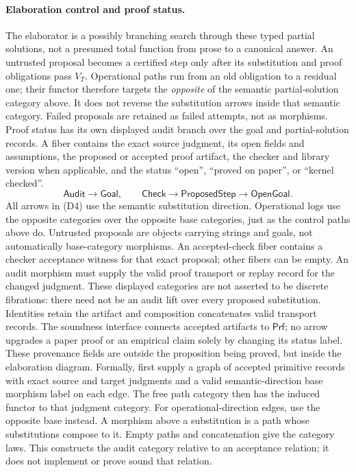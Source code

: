 \documentclass[11pt]{article}
\newcommand{\Cat}[1]{\mathsf{#1}}
\begin{document}
\paragraph{Elaboration control and proof status.}
The elaborator is a possibly branching search through these typed partial
solutions, not a presumed total function from prose to a canonical answer.
An untrusted proposal becomes a certified step only after its substitution
and proof obligations pass $V_T$. Operational paths run from an old obligation to a residual one; their
functor therefore targets the \emph{opposite} of the semantic
partial-solution category above. It does not reverse the substitution
arrows inside that semantic category. Failed proposals are retained as failed
attempts, not as morphisms. Proof status has its own displayed audit branch over the goal and
partial-solution records. A fiber contains the exact source judgment,
its open fields and assumptions, the proposed or accepted proof artifact,
the checker and library version when applicable, and the status
``open'', ``proved on paper'', or ``kernel checked''.
\[
 \Cat{Audit}\longrightarrow\Cat{Goal},\qquad
 \Cat{Check}\longrightarrow\Cat{ProposedStep}\longrightarrow\Cat{OpenGoal}.
                                                               \tag{D4}
\]
All arrows in (D4) use the semantic substitution direction. Operational
logs use the opposite categories over the opposite base categories, just
as the control paths above do. Untrusted proposals are objects carrying
strings and goals, not automatically base-category morphisms.
An accepted-check fiber contains a checker acceptance witness for that
exact proposal; other fibers can be empty. An audit morphism must supply
the valid proof transport or replay record for the changed judgment.
These displayed categories are not asserted to be discrete fibrations:
there need not be an audit lift over every proposed substitution.
Identities retain the artifact and composition concatenates valid
transport records. The soundness interface connects accepted artifacts
to $\Cat{Prf}$; no arrow upgrades a paper proof or an empirical claim
solely by changing its status label. These provenance fields are outside
the proposition being proved, but inside the elaboration diagram.
Formally, first supply a graph of accepted primitive records with exact
source and target judgments and a valid semantic-direction base morphism
label on each edge. The free path category then has the induced functor
to that judgment category. For operational-direction edges, use the
opposite base instead. A morphism above a substitution is a path whose substitutions
compose to it. Empty paths and concatenation give the category laws.
This constructs the audit category relative to an acceptance relation;
it does not implement or prove sound that relation.
\end{document}
